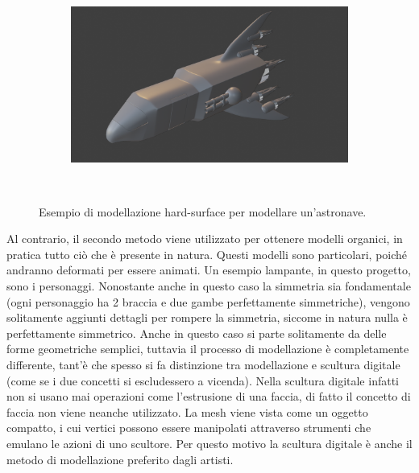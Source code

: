 \begin{figure}
\begin{subfigure}{.5\textwidth}
\end{subfigure}%
\begin{subfigure}{.5\textwidth}
  \centering
  \includegraphics[width=.99\linewidth]{Figures/box4.png}
\end{subfigure}\\[2ex]
\decoRule
\caption[Modellazione hard-surface]{Esempio di modellazione hard-surface per modellare un'astronave.}
\label{fig:box-model}
\end{figure}

Al contrario, il secondo metodo viene utilizzato per ottenere modelli organici, in pratica tutto ciò che è presente in natura.
Questi modelli sono particolari, poiché andranno deformati per essere animati.
Un esempio lampante, in questo progetto, sono i personaggi.
Nonostante anche in questo caso la simmetria sia fondamentale (ogni personaggio ha 2 braccia e due gambe perfettamente simmetriche), vengono solitamente aggiunti dettagli per rompere la simmetria, siccome in natura nulla è perfettamente simmetrico.
Anche in questo caso si parte solitamente da delle forme geometriche semplici, tuttavia il processo di modellazione è completamente differente, tant'è che spesso si fa distinzione tra modellazione e scultura digitale (come se i due concetti si escludessero a vicenda).
Nella scultura digitale infatti non si usano mai operazioni come l'estrusione di una faccia, di fatto il concetto di faccia non viene neanche utilizzato.
La mesh viene vista come un oggetto compatto, i cui vertici possono essere manipolati attraverso strumenti che emulano le azioni di uno scultore.
Per questo motivo la scultura digitale è anche il metodo di modellazione preferito dagli artisti.
\newline

